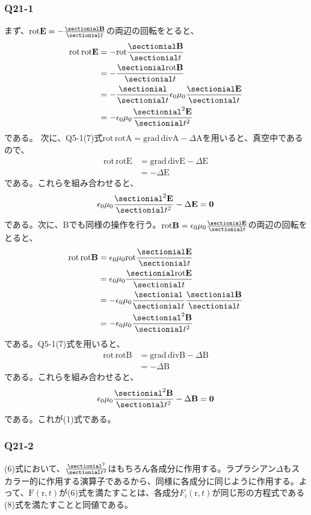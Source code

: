 \documentclass[platex,dvipdfmx,a4paper]{jsarticle}
\newcommand{\hb}[2]{\frac{\sectionial #1}{\sectionial #2}}
\newcommand{\hhb}[2]{\frac{\sectionial^2 #1}{\sectionial #2^2}}
\newcommand{\vect}[1]{\boldsymbol{\mathrm{#1}}}
\begin{document}
  \subsubsection*{Q21-1}
  まず、$\mathrm{rot}\vect{E}=-\hb{\vect{B}}{t}$の両辺の回転をとると、
  \begin{align*}
    \mathrm{rot}\,\mathrm{rot}\vect{E}&=-\mathrm{rot}\hb{\vect{B}}{t}\\
    &=-\hb{\mathrm{rot}\vect{B}}{t}\\
    &=-\hb{}{t}\epsilon_0\mu_0\hb{\vect{E}}{t}\\
    &=-\epsilon_0\mu_0\hhb{\vect{E}}{t}
  \end{align*}
  である。
  次に、Q5-1(7)式$\mathrm{rot}\,\mathrm{rot}\vect{A}=\mathrm{grad}\,\mathrm{div}\vect{A}-\Delta\vect{A}$を用いると、真空中であるので、
  \begin{align*}
    \mathrm{rot}\,\mathrm{rot}\vect{E} &= \mathrm{grad}\,\mathrm{div}\vect{E}-\Delta\vect{E}\\
    &= - \Delta\vect{E}
  \end{align*}
  である。これらを組み合わせると、
  \begin{align*}
    \epsilon_0\mu_0\hhb{\vect{E}}{t} - \Delta\vect{E} = \vect{0}
  \end{align*}
  である。次に、$\vect{B}$でも同様の操作を行う。$\mathrm{rot}\vect{B}=\epsilon_0\mu_0\hb{\vect{E}}{t}$の両辺の回転をとると、
  \begin{align*}
    \mathrm{rot}\,\mathrm{rot}\vect{B} &= \epsilon_0\mu_0\mathrm{rot}\hb{\vect{E}}{t}\\
    &= \epsilon_0\mu_0\hb{\mathrm{rot}\vect{E}}{t}\\
    &= -\epsilon_0\mu_0\hb{}{t}\hb{\vect{B}}{t}\\
    &=-\epsilon_0\mu_0\hhb{\vect{B}}{t}
  \end{align*}
  である。Q5-1(7)式を用いると、
  \begin{align*}
    \mathrm{rot}\,\mathrm{rot}\vect{B} &= \mathrm{grad}\,\mathrm{div}\vect{B}-\Delta\vect{B}\\
    &= -\Delta\vect{B}
  \end{align*}
  である。これらを組み合わせると、
  \begin{align*}
    \epsilon_0\mu_0\hhb{\vect{B}}{t} - \Delta\vect{B} = \vect{0}
  \end{align*}
  である。これが(1)式である。





  \subsubsection*{Q21-2}
  (6)式において、$\hhb{}{t}$はもちろん各成分に作用する。ラプラシアン$\Delta$もスカラー的に作用する演算子であるから、同様に各成分に同じように作用する。よって、$\vect{F}(\vect{r},t)$が(6)式を満たすことは、各成分$F_i(\vect{r},t)$が同じ形の方程式である(8)式を満たすことと同値である。
\end{document}
